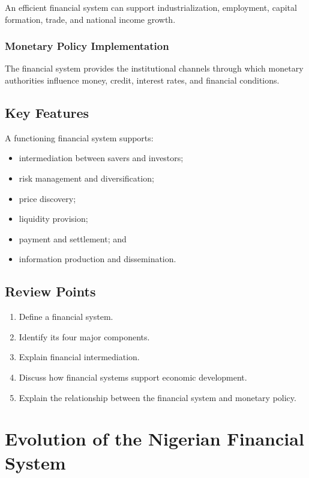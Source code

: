 \documentclass[
]{article}
\providecommand{\tightlist}{%
  \setlength{\itemsep}{0pt}\setlength{\parskip}{0pt}}
\begin{document}
An efficient financial system can support industrialization, employment, capital formation, trade, and national income growth.

\subsubsection{Monetary Policy Implementation}\label{monetary-policy-implementation}

The financial system provides the institutional channels through which monetary authorities influence money, credit, interest rates, and financial conditions.

\subsection{Key Features}\label{key-features}

A functioning financial system supports:

\begin{itemize}
\tightlist
\item
  intermediation between savers and investors;
\item
  risk management and diversification;
\item
  price discovery;
\item
  liquidity provision;
\item
  payment and settlement; and
\item
  information production and dissemination.
\end{itemize}

\subsection{Review Points}\label{review-points}

\begin{enumerate}
\def\labelenumi{\arabic{enumi}.}
\tightlist
\item
  Define a financial system.
\item
  Identify its four major components.
\item
  Explain financial intermediation.
\item
  Discuss how financial systems support economic development.
\item
  Explain the relationship between the financial system and monetary policy.
\end{enumerate}

\section{Evolution of the Nigerian Financial System}\label{evolution-of-the-nigerian-financial-system}
\end{document}
